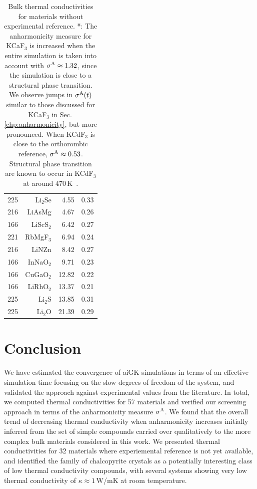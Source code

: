 \begin{table}[ht]
\begin{tabular}{rrrr}
         225 &    Li$_2$Se &                4.55 &       0.33 \\
         216 &      LiAsMg &                4.67 &       0.26 \\
         166 &   LiScS$_2$ &                6.42 &       0.27 \\
         221 &   RbMgF$_3$ &                6.94 &       0.24 \\
         216 &       LiNZn &                8.42 &       0.27 \\
         166 &   InNaO$_2$ &                9.71 &       0.23 \\
         166 &   CuGaO$_2$ &               12.82 &       0.22 \\
         166 &   LiRhO$_2$ &               13.37 &       0.21 \\
         225 &     Li$_2$S &               13.85 &       0.31 \\
         225 &     Li$_2$O &               21.39 &       0.29 \\
\bottomrule
\end{tabular}
  \caption{Bulk thermal conductivities for materials without experimental reference. *: The anharmonicity measure for KCaF$_3$ is increased when the entire simulation is taken into account with $\sigma^\mathrm{A} \approx 1.32$, since the simulation is close to a structural phase transition. We observe jumps in $\sigma^\mathrm{A} (t)$ similar to those discussed for KCaF$_3$ in Sec.\,\ref{chp:anharmonicity}, but more pronounced. When KCdF$_3$ is close to the orthorombic reference, $\sigma^\mathrm{A} \approx 0.53$. Structural phase transition are known to occur in KCdF$_3$ at around 470\,K~\cite{hidaka1977,hidaka1990}.}
  \label{tab:kappa.noexp}
\end{table}

\section{Conclusion}
We have estimated the convergence of aiGK simulations in terms of an effective simulation time focusing on the slow degrees of freedom of the system, and validated the approach against experimental values from the literature. In total, we computed thermal conductivities for  57 materials and verified our screening approach in terms of the anharmonicity measure $\sigma^\mathrm{A}$. We found that the overall trend of decreasing thermal conductivity when anharmonicity increases initially inferred from the set of simple compounds carried over qualitatively to the more complex bulk materials considered in this work. We presented thermal conductivities for  32 materials where experiemental reference is not yet available, and identified the family of chalcopyrite crystals as a potentially interesting class of low thermal conductivity compounds, with several systems showing very low thermal conductivity of $\kappa \approx 1$\,W/mK at room temperature.